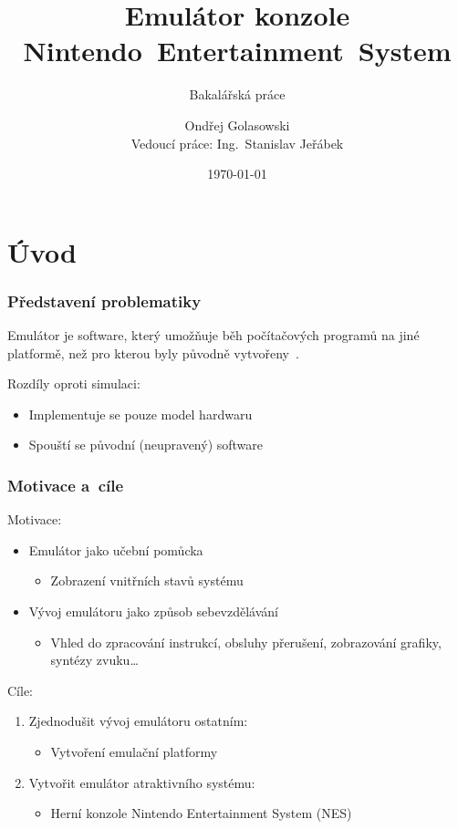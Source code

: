 \documentclass{beamer}
\title[Emulátor konzole NES]{Emulátor konzole Nintendo~Entertainment~System}
\subtitle{Bakalářská práce}
\author[Ondřej Golasowski]{Ondřej Golasowski\texorpdfstring{\\}{}Vedoucí práce: Ing.~Stanislav Jeřábek}
\institute[FIT ČVUT]{Katedra číslicového návrhu, FIT ČVUT}
\date{\today}
\begin{document}
	
\begingroup
{}
\begin{frame}[noframenumbering]
	\titlepage
\end{frame}
\endgroup

\section{Úvod}
\begin{frame}
	\frametitle{Představení problematiky}
	\begin{definice}[Emulátor]
		Emulátor je software, který umožňuje běh počítačových programů na jiné platformě, než pro kterou byly původně vytvořeny~.
	\end{definice}
	Rozdíly oproti simulaci:
	\begin{itemize}
		\item Implementuje se pouze model hardwaru
		\item Spouští se původní (neupravený) software
	\end{itemize}
\end{frame}

\begin{frame}
	\frametitle{Motivace a~cíle}
	Motivace:
	\begin{itemize}
		\item Emulátor jako učební pomůcka
		\begin{itemize}
			\item Zobrazení vnitřních stavů systému
		\end{itemize}
		\item Vývoj emulátoru jako způsob sebevzdělávání
		\begin{itemize}
			\item Vhled do zpracování instrukcí, obsluhy přerušení, zobrazování grafiky, syntézy zvuku\dots
		\end{itemize}
	\end{itemize}
	Cíle:
	\begin{enumerate}
		\item Zjednodušit vývoj emulátoru ostatním:
		\begin{itemize}
			\item Vytvoření emulační platformy
		\end{itemize}
		\item Vytvořit emulátor atraktivního systému:
		\begin{itemize}
			\item Herní konzole Nintendo Entertainment System (NES)
		\end{itemize}
	\end{enumerate}
\end{frame}
\end{document}
